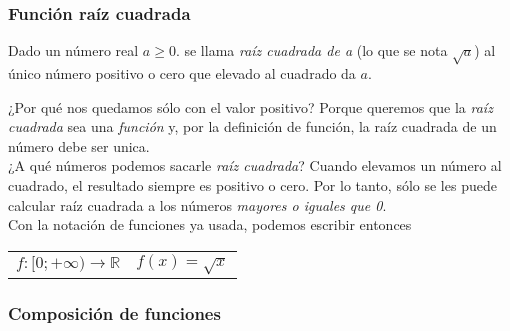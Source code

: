 \documentclass[Análisis.root.tex]{subfiles}
\newcommand{\R}{\mathbb{R}}
\begin{document}
        \subsubsection{Función raíz cuadrada}
        Dado un número real \(a\geq0\). se llama \textit{raíz cuadrada de a} (lo que se nota \(\sqrt{a}\)) al único número positivo o cero que elevado al cuadrado da \(a\).
        \begin{center}
        \end{center}
        ¿Por qué nos quedamos sólo con el valor positivo? Porque queremos que la \textit{raíz cuadrada} sea una \textit{función} y, por la definición de función, la raíz cuadrada de un número debe ser unica.\\
        ¿A qué números podemos sacarle \textit{raíz cuadrada}? Cuando elevamos un número al cuadrado, el resultado siempre es positivo o cero. Por lo tanto, sólo se les puede calcular raíz cuadrada a los números \textit{mayores o iguales que 0}.\\
        Con la notación de funciones ya usada, podemos escribir entonces
        \begin{center}
            \begin{tabularx}{.6\textwidth}{XX}
                \centering\(f:[0;+\infty)\rightarrow\R\) & \centering\(f(x)=\sqrt{x}\)
            \end{tabularx}
        \end{center}
        \subsubsection{Composición de funciones}
\end{document}
